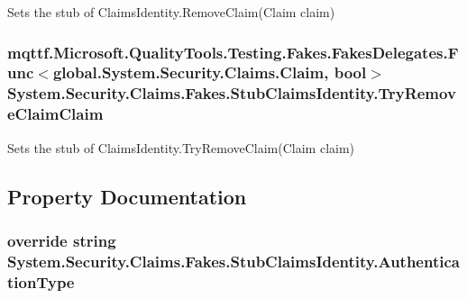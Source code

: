 Sets the stub of Claims\-Identity.\-Remove\-Claim(\-Claim claim)

\hypertarget{class_system_1_1_security_1_1_claims_1_1_fakes_1_1_stub_claims_identity_a2e4fa03d6fa8676dc45462be4a6ae055}{
\subsubsection[{Try\-Remove\-Claim\-Claim}]{\setlength{\rightskip}{0pt plus 5cm}mqttf.\-Microsoft.\-Quality\-Tools.\-Testing.\-Fakes.\-Fakes\-Delegates.\-Func$<$global.\-System.\-Security.\-Claims.\-Claim, bool$>$ System.\-Security.\-Claims.\-Fakes.\-Stub\-Claims\-Identity.\-Try\-Remove\-Claim\-Claim}}\label{class_system_1_1_security_1_1_claims_1_1_fakes_1_1_stub_claims_identity_a2e4fa03d6fa8676dc45462be4a6ae055}


Sets the stub of Claims\-Identity.\-Try\-Remove\-Claim(\-Claim claim)



\subsection{Property Documentation}
\hypertarget{class_system_1_1_security_1_1_claims_1_1_fakes_1_1_stub_claims_identity_ad81bf1aada585267ef9aa8f902284540}{
\subsubsection[{Authentication\-Type}]{\setlength{\rightskip}{0pt plus 5cm}override string System.\-Security.\-Claims.\-Fakes.\-Stub\-Claims\-Identity.\-Authentication\-Type\hspace{0.3cm}{\ttfamily [get]}}}\label{class_system_1_1_security_1_1_claims_1_1_fakes_1_1_stub_claims_identity_ad81bf1aada585267ef9aa8f902284540}


